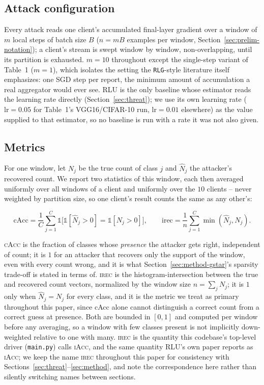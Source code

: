 \subsection{Attack configuration}
\label{sec:eval-attack}

Every attack reads one client's accumulated final-layer gradient over a
window of $m$ local steps of batch size $B$ ($n=mB$ examples per window,
Section~\ref{sec:prelim-notation}); a client's stream is swept window by
window, non-overlapping, until its partition is exhausted. $m=10$
throughout except the single-step variant of Table~1 ($m=1$), which
isolates the setting the \texttt{RLG}-style literature itself emphasizes:
one SGD step per report, the minimum amount of accumulation a real
aggregator would ever see. RLU is the only baseline whose estimator reads
the learning rate directly (Section~\ref{sec:threat}); we use its own
learning rate ($\mathrm{lr}=0.05$ for Table~1's VGG16/CIFAR-10 run,
$\mathrm{lr}=0.01$ elsewhere) as the value supplied to that estimator, so
no baseline is run with a rate it was not also given.

\subsection{Metrics}
\label{sec:eval-metrics}

For one window, let $N_j$ be the true count of class $j$ and $\widehat
N_j$ the attacker's recovered count. We report two statistics of this
window, each then averaged uniformly over all windows of a client and
uniformly over the $10$ clients -- never weighted by partition size, so
one client's result counts the same as any other's:

\[
\mathrm{cAcc} = \frac1C\sum_{j=1}^C \mathbb{1}\bigl[\mathbb{1}[\widehat
N_j>0] = \mathbb{1}[N_j>0]\bigr],
\qquad
\mathrm{irec} = \frac1n\sum_{j=1}^C \min(\widehat N_j, N_j).
\]

\textsc{cAcc} is the fraction of classes whose \emph{presence} the
attacker gets right, independent of count; it is $1$ for an attacker that
recovers only the support of the window, even with every count wrong, and
it is what Section~\ref{sec:method-gstar}'s sparsity trade-off is stated
in terms of. \textsc{irec} is the histogram-intersection between the true
and recovered count vectors, normalized by the window size $n=\sum_j
N_j$; it is $1$ only when $\widehat N_j=N_j$ for every class, and it is
the metric we treat as primary throughout this paper, since cAcc alone
cannot distinguish a correct count from a correct guess at presence. Both
are bounded in $[0,1]$ and computed per window before any averaging, so a
window with few classes present is not implicitly down-weighted relative
to one with many. \textsc{irec} is the quantity this codebase's top-level
driver (\texttt{main.py}) calls \textsc{iAcc}, and the same quantity
RLU's own paper reports as \textsc{iAcc}; we keep the name \textsc{irec}
throughout this paper for consistency with
Sections~\ref{sec:threat}--\ref{sec:method}, and note the correspondence
here rather than silently switching names between sections.

